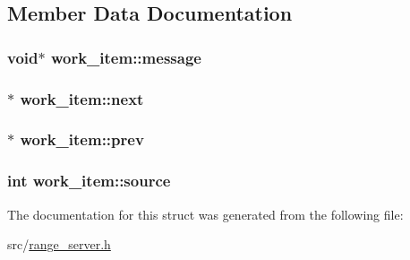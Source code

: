 \subsection{Member Data Documentation}
\hypertarget{structwork__item_a2c6449b530233592562d05debbab126f}{
\subsubsection[{message}]{\setlength{\rightskip}{0pt plus 5cm}void$\ast$ work\-\_\-item\-::message}}\label{d1/dc4/structwork__item_a2c6449b530233592562d05debbab126f}
\hypertarget{structwork__item_a63063b910e219526f27dcd391ed4af38}{
\subsubsection[{next}]{$\ast$ work\-\_\-item\-::next}}\label{d1/dc4/structwork__item_a63063b910e219526f27dcd391ed4af38}
\hypertarget{structwork__item_adf400e3104c2071b1f192d48690408b4}{
\subsubsection[{prev}]{$\ast$ work\-\_\-item\-::prev}}\label{d1/dc4/structwork__item_adf400e3104c2071b1f192d48690408b4}
\hypertarget{structwork__item_aafb1f7c16f606a3fd5a9ee24d3a34a42}{
\subsubsection[{source}]{\setlength{\rightskip}{0pt plus 5cm}int work\-\_\-item\-::source}}\label{d1/dc4/structwork__item_aafb1f7c16f606a3fd5a9ee24d3a34a42}


The documentation for this struct was generated from the following file\-:\begin{DoxyCompactItemize}
\item 
src/\hyperlink{range__server_8h}{range\-\_\-server.\-h}\end{DoxyCompactItemize}

